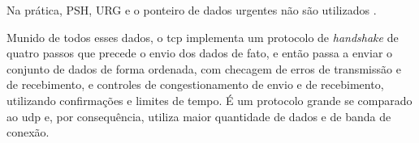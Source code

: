 Na prática, PSH, URG e o ponteiro de dados urgentes não são utilizados
\cite{book:kurose}.

Munido de todos esses dados, o \gls*{tcp} implementa um protocolo de \emph{handshake} de
quatro passos que precede o envio dos dados de fato, e então passa a enviar o conjunto
de dados de forma ordenada, com checagem de erros de transmissão e de recebimento, e
controles de congestionamento de envio e de recebimento, utilizando confirmações e
limites de tempo. É um protocolo grande se comparado ao \gls*{udp} e, por consequência,
utiliza maior quantidade de dados e de banda de conexão.
